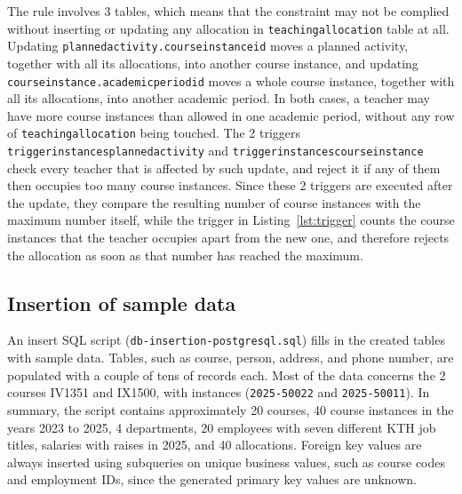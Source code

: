 \documentclass[a4paper]{scrartcl}
\renewcommand{\_}{\textunderscore\allowbreak}
\begin{document}
The rule involves 3 tables, which means that the constraint may not be complied without inserting or updating any allocation in \texttt{teaching\_allocation} table at all. Updating \texttt{planned\_activity.course\_instance\_id} moves a planned activity, together with all its allocations, into another course instance, and updating \texttt{course\_instance.academic\_period\_id} moves a whole course instance, together with all its allocations, into another academic period. In both cases, a teacher may have more course instances than allowed in one academic period, without any row of \texttt{teaching\_allocation} being touched. The 2 triggers \texttt{trigger\_4\_instances\_planned\_activity} and \texttt{trigger\_4\_instances\_course\_instance} check every teacher that is affected by such update, and reject it if any of them then occupies too many course instances. Since these 2 triggers are executed after the update, they compare the resulting number of course instances with the maximum number itself, while the trigger in Listing~\ref{lst:trigger} counts the course instances that the teacher occupies apart from the new one, and therefore rejects the allocation as soon as that number has reached the maximum.


\subsection{Insertion of sample data}

An insert SQL script (\texttt{db-insertion-postgresql.sql}) fills in the created tables with sample data. Tables, such as course, person, address, and phone number, are populated with a couple of tens of records each. Most of the data concerns the 2 courses IV1351 and IX1500, with instances (\texttt{2025-50022} and \texttt{2025-50011}). In summary, the script contains approximately 20 courses, 40 course instances in the years 2023 to 2025, 4 departments, 20 employees with seven different KTH job titles, salaries with raises in 2025, and 40 allocations. Foreign key values are always inserted using subqueries on unique business values, such as course codes and employment IDs, since the generated primary key values are unknown.
\end{document}
